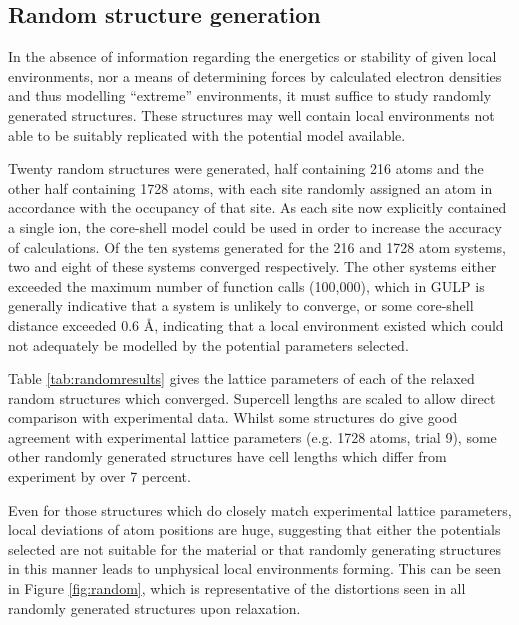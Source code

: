 \subsection{Random structure generation}
In the absence of information regarding the energetics or stability of given local environments, nor a means of determining forces by calculated electron densities and thus modelling ``extreme'' environments, it must suffice to study randomly generated structures.
These structures may well contain local environments not able to be suitably replicated with the potential model available.

Twenty random structures were generated, half containing 216 atoms and the other half containing 1728 atoms, with each site randomly assigned an atom in accordance with the occupancy of that site.
As each site now explicitly contained a single ion, the core-shell model could be used in order to increase the accuracy of calculations.
Of the ten systems generated for the 216 and 1728 atom systems, two and eight of these systems converged respectively.
The other systems either exceeded the maximum number of function calls (100,000), which in GULP is generally indicative that a system is unlikely to converge, or some core-shell distance exceeded 0.6 \AA, indicating that a local environment existed which could not adequately be modelled by the potential parameters selected.

Table \ref{tab:randomresults} gives the lattice parameters of each of the relaxed random structures which converged.
Supercell lengths are scaled to allow direct comparison with experimental data.\cite{Freire2016}
Whilst some structures do give good agreement with experimental lattice parameters (e.g. 1728 atoms, trial 9), some other randomly generated structures have cell lengths which differ from experiment by over 7 percent.

Even for those structures which do closely match experimental lattice parameters, local deviations of atom positions are huge, suggesting that either the potentials selected are not suitable for the material or that randomly generating structures in this manner leads to unphysical local environments forming. This can be seen in Figure \ref{fig:random}, which is representative of the distortions seen in all randomly generated structures upon relaxation.

